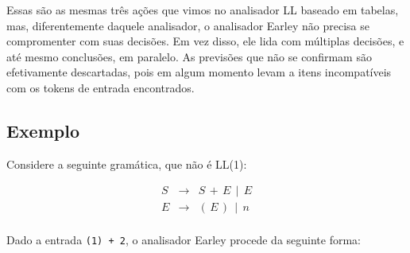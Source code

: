 Essas são as mesmas três ações que vimos no analisador LL baseado em
tabelas, mas, diferentemente daquele analisador, o analisador Earley
não precisa se compromenter com suas decisões. Em vez disso, ele lida
com múltiplas decisões, e até mesmo conclusões, em paralelo. As
previsões que não se confirmam são efetivamente descartadas, pois em
algum momento levam a itens incompatíveis com os tokens de entrada encontrados.

\subsection{Exemplo}

Considere a seguinte gramática, que não é LL(1):

\[
\begin{array}{lcl}
  S & \to & S\,+\,E\,\mid\,E\\
  E & \to & (\,E\,)\,\mid\,n\\
\end{array}
\]

Dado a entrada \verb|(1) + 2|, o analisador Earley
procede da seguinte forma:


